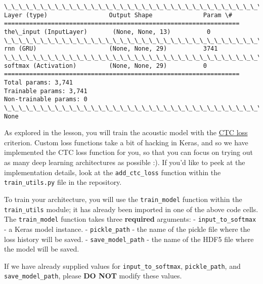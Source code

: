 \documentclass[11pt]{article}
\begin{document}
    \begin{Verbatim}[commandchars=\\\{\}]
\_\_\_\_\_\_\_\_\_\_\_\_\_\_\_\_\_\_\_\_\_\_\_\_\_\_\_\_\_\_\_\_\_\_\_\_\_\_\_\_\_\_\_\_\_\_\_\_\_\_\_\_\_\_\_\_\_\_\_\_\_\_\_\_\_
Layer (type)                 Output Shape              Param \#   
=================================================================
the\_input (InputLayer)       (None, None, 13)          0         
\_\_\_\_\_\_\_\_\_\_\_\_\_\_\_\_\_\_\_\_\_\_\_\_\_\_\_\_\_\_\_\_\_\_\_\_\_\_\_\_\_\_\_\_\_\_\_\_\_\_\_\_\_\_\_\_\_\_\_\_\_\_\_\_\_
rnn (GRU)                    (None, None, 29)          3741      
\_\_\_\_\_\_\_\_\_\_\_\_\_\_\_\_\_\_\_\_\_\_\_\_\_\_\_\_\_\_\_\_\_\_\_\_\_\_\_\_\_\_\_\_\_\_\_\_\_\_\_\_\_\_\_\_\_\_\_\_\_\_\_\_\_
softmax (Activation)         (None, None, 29)          0         
=================================================================
Total params: 3,741
Trainable params: 3,741
Non-trainable params: 0
\_\_\_\_\_\_\_\_\_\_\_\_\_\_\_\_\_\_\_\_\_\_\_\_\_\_\_\_\_\_\_\_\_\_\_\_\_\_\_\_\_\_\_\_\_\_\_\_\_\_\_\_\_\_\_\_\_\_\_\_\_\_\_\_\_
None

    \end{Verbatim}

    As explored in the lesson, you will train the acoustic model with the
\href{http://www.cs.toronto.edu/~graves/icml_2006.pdf}{CTC loss}
criterion. Custom loss functions take a bit of hacking in Keras, and so
we have implemented the CTC loss function for you, so that you can focus
on trying out as many deep learning architectures as possible :). If
you'd like to peek at the implementation details, look at the
\texttt{add\_ctc\_loss} function within the \texttt{train\_utils.py}
file in the repository.

To train your architecture, you will use the \texttt{train\_model}
function within the \texttt{train\_utils} module; it has already been
imported in one of the above code cells. The \texttt{train\_model}
function takes three \textbf{required} arguments: -
\texttt{input\_to\_softmax} - a Keras model instance. -
\texttt{pickle\_path} - the name of the pickle file where the loss
history will be saved. - \texttt{save\_model\_path} - the name of the
HDF5 file where the model will be saved.

If we have already supplied values for \texttt{input\_to\_softmax},
\texttt{pickle\_path}, and \texttt{save\_model\_path}, please \textbf{DO
NOT} modify these values.
\end{document}
